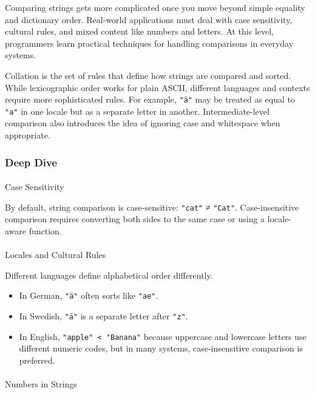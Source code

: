 \documentclass[
  letterpaper,
  DIV=11,
  numbers=noendperiod]{scrreprt}
\makeatletter
\let\oldparagraph\paragraph
\renewcommand{\paragraph}{
    \@ifstar
      \xxxParagraphStar
      \xxxParagraphNoStar
  }
\newcommand{\xxxParagraphStar}[1]{\oldparagraph*{#1}\mbox{}}
\newcommand{\xxxParagraphNoStar}[1]{\oldparagraph{#1}\mbox{}}
\providecommand{\tightlist}{%
  \setlength{\itemsep}{0pt}\setlength{\parskip}{0pt}}
\makeatother
\begin{document}
Comparing strings gets more complicated once you move beyond simple
equality and dictionary order. Real-world applications must deal with
case sensitivity, cultural rules, and mixed content like numbers and
letters. At this level, programmers learn practical techniques for
handling comparisons in everyday systems.

Collation is the set of rules that define how strings are compared and
sorted. While lexicographic order works for plain ASCII, different
languages and contexts require more sophisticated rules. For example,
\texttt{"ä"} may be treated as equal to \texttt{"a"} in one locale but
as a separate letter in another. Intermediate-level comparison also
introduces the idea of ignoring case and whitespace when appropriate.

\subsubsection{Deep Dive}\label{deep-dive-29}

\paragraph{Case Sensitivity}\label{case-sensitivity}

By default, string comparison is case-sensitive: \texttt{"cat"} ≠
\texttt{"Cat"}. Case-insensitive comparison requires converting both
sides to the same case or using a locale-aware function.

\paragraph{Locales and Cultural Rules}\label{locales-and-cultural-rules}

Different languages define alphabetical order differently.

\begin{itemize}
\tightlist
\item
  In German, \texttt{"ä"} often sorts like \texttt{"ae"}.
\item
  In Swedish, \texttt{"ä"} is a separate letter after \texttt{"z"}.
\item
  In English, \texttt{"apple"\ \textless{}\ "Banana"} because uppercase
  and lowercase letters use different numeric codes, but in many
  systems, case-insensitive comparison is preferred.
\end{itemize}

\paragraph{Numbers in Strings}\label{numbers-in-strings}
\end{document}
